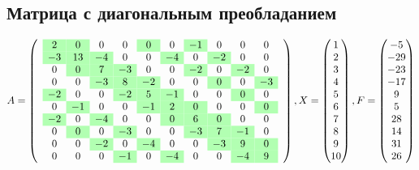 \subsection{Матрица с диагональным преобладанием}
$$ A=\left(\quad\begin{matrix}
\cellcolor{green!30}2 & \cellcolor{green!30}0 & 0 & 0 & \cellcolor{green!30}0 & 0 & \cellcolor{green!30}-1 & 0 & 0 & 0 \\
\cellcolor{green!30}-3 & \cellcolor{green!30}13 & \cellcolor{green!30}-4 & 0 & 0 & \cellcolor{green!30}-4 & 0 & \cellcolor{green!30}-2 & 0 & 0 \\
0 & \cellcolor{green!30}0 & \cellcolor{green!30}7 & \cellcolor{green!30}-3 & 0 & 0 & \cellcolor{green!30}-2 & 0 & \cellcolor{green!30}-2 & 0 \\
0 & 0 & \cellcolor{green!30}-3 & \cellcolor{green!30}8 & \cellcolor{green!30}-2 & 0 & 0 & \cellcolor{green!30}0 & 0 & \cellcolor{green!30}-3 \\
\cellcolor{green!30}-2 & 0 & 0 & \cellcolor{green!30}-2 & \cellcolor{green!30}5 & \cellcolor{green!30}-1 & 0 & 0 & \cellcolor{green!30}0 & 0 \\
0 & \cellcolor{green!30}-1 & 0 & 0 & \cellcolor{green!30}-1 & \cellcolor{green!30}2 & \cellcolor{green!30}0 & 0 & 0 & \cellcolor{green!30}0 \\
\cellcolor{green!30}-2 & 0 & \cellcolor{green!30}-4 & 0 & 0 & \cellcolor{green!30}0 & \cellcolor{green!30}6 & \cellcolor{green!30}0 & 0 & 0 \\
0 & \cellcolor{green!30}0 & 0 & \cellcolor{green!30}-3 & 0 & 0 & \cellcolor{green!30}-3 & \cellcolor{green!30}7 & \cellcolor{green!30}-1 & 0 \\
0 & 0 & \cellcolor{green!30}-2 & 0 & \cellcolor{green!30}-4 & 0 & 0 & \cellcolor{green!30}-3 & \cellcolor{green!30}9 & \cellcolor{green!30}0 \\
0 & 0 & 0 & \cellcolor{green!30}-1 & 0 & \cellcolor{green!30}-4 & 0 & 0 & \cellcolor{green!30}-4 & \cellcolor{green!30}9 
\end{matrix}\quad\right), X=\begin{pmatrix}1 \\
2 \\
3 \\
4 \\
5 \\
6 \\
7 \\
8 \\
9 \\
10 
\end{pmatrix}, F=\begin{pmatrix}-5 \\
-29 \\
-23 \\
-17 \\
9 \\
5 \\
28 \\
14 \\
31 \\
26 
\end{pmatrix} $$

